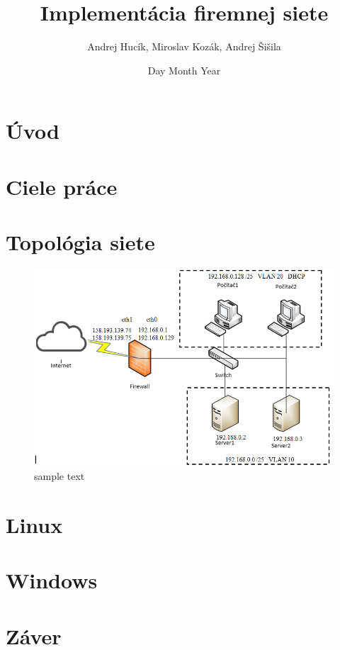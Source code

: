 \documentclass[12pt,twoside]{report}
\title{Implementácia firemnej siete}
\author{Andrej Hucík, Miroslav Kozák, Andrej Šišila}
\date{Day Month Year}
\begin{document}


%

\tableofcontents

\listoffigures


\chapter{Úvod}


\chapter{Ciele práce}


\chapter{Topológia siete}


\begin{figure}[!ht]
\includegraphics[scale=0.5]{general_logicka_topologia}
\caption{sample text}
\label{fig:foo}
\end{figure}





\chapter{Linux}


\chapter{Windows}


\chapter{Záver}


\printbibliography
\end{document}
